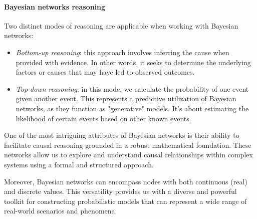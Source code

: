 \paragraph*{Bayesian networks reasoning}
Two distinct modes of reasoning are applicable when working with Bayesian networks:
\begin{itemize}
    \item \textit{Bottom-up reasoning}: this approach involves inferring the cause when provided with evidence. 
        In other words, it seeks to determine the underlying factors or causes that may have led to observed outcomes.
    \item \textit{Top-down reasoning}: in this mode, we calculate the probability of one event given another event. 
        This represents a predictive utilization of Bayesian networks, as they function as "generative" models. 
        It's about estimating the likelihood of certain events based on other known events.
\end{itemize}
One of the most intriguing attributes of Bayesian networks is their ability to facilitate causal reasoning grounded in a robust mathematical foundation. 
These networks allow us to explore and understand causal relationships within complex systems using a formal and structured approach.

Moreover, Bayesian networks can encompass nodes with both continuous (real) and discrete values. 
This versatility provides us with a diverse and powerful toolkit for constructing probabilistic models that can represent a wide range of real-world scenarios and phenomena.